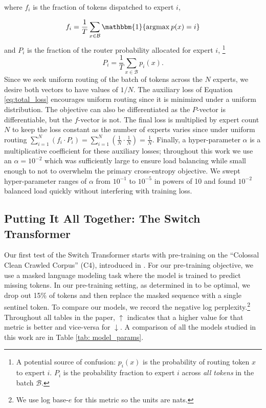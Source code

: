 \documentclass[twoside,11pt]{article}
\begin{document}
\noindent where $f_i$ is the fraction of tokens dispatched to expert $i$,

\begin{equation} \label{eq:token_sum}
f_i = \frac{1}{T}\sum_{x \in \mathcal{B}} \mathbbm{1} \{\text{argmax}\: p(x) = i\} 
\end{equation}
and $P_i$ is the fraction of the router probability allocated for expert $i$, 
\footnote[2]{A potential source of confusion: $p_i(x)$ is the probability of routing token $x$ to expert $i$. $P_i$ is the probability fraction to expert $i$ across \emph{all tokens} in the batch $\mathcal{B}$.}
\begin{equation} \label{eq:prob_sum}
P_i = \frac{1}{T}\sum_{x \in \mathcal{B}} p_i(x).
\end{equation}
Since we seek uniform routing of the batch of tokens across the $N$ experts, we desire both vectors to have values of $1/N$.
The auxiliary loss of Equation \ref{eq:total_loss} encourages uniform routing since it is minimized under a uniform distribution. The objective can also be differentiated as the $P$-vector is differentiable, but the $f$-vector is not.
The final loss is multiplied by expert count $N$ to keep the loss constant as the number of experts varies since under uniform routing $\sum_{i=1}^N (f_i\cdot P_i) = \sum_{i=1}^N (\frac{1}{N}\cdot \frac{1}{N}) = \frac{1}{N}$.
Finally, a hyper-parameter $\alpha$ is a multiplicative coefficient for these auxiliary losses; throughout this work we use an $\alpha=10^{-2}$ which was sufficiently large to ensure load balancing while small enough to not to overwhelm the primary cross-entropy objective.
We swept hyper-parameter ranges of $\alpha$ from $10^{-1}$ to $10^{-5}$ in powers of 10 and found $10^{-2}$ balanced load quickly without interfering with training loss.

\subsection{Putting It All Together: The Switch Transformer}
Our first test of the Switch Transformer starts with pre-training on the ``Colossal Clean Crawled Corpus'' (C4), introduced in \citep{raffel2019exploring}.
For our pre-training objective, we use a masked language modeling task \citep{taylor1953cloze, fedus2018maskgan, devlin2018bert} where the model is trained to predict missing tokens.
In our pre-training setting, as determined in \citet{raffel2019exploring} to be optimal, we drop out 15\% of tokens and then replace the masked sequence with a single sentinel token.
To compare our models, we record the negative log perplexity.\footnote{We use log base-$e$ for this metric so the units are nats.}
Throughout all tables in the paper, $\uparrow$ indicates that a higher value for that metric is better and vice-versa for $\downarrow$. 
A comparison of all the models studied in this work are in Table \ref{tab: model_params}.
\end{document}
